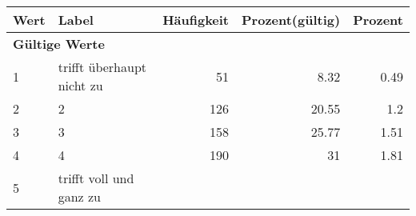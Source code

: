      \begin{longtable}{lXrrr}
     \toprule
     \textbf{Wert} & \textbf{Label} & \textbf{Häufigkeit} & \textbf{Prozent(gültig)} & \textbf{Prozent} \\
     \endhead
     \midrule
     \multicolumn{5}{l}{\textbf{Gültige Werte}}\\

     1 &
     \multicolumn{1}{X}{ trifft überhaupt nicht zu   } &


       \num{51} &
       \num[round-mode=places,round-precision=2]{8,32} &
         \num[round-mode=places,round-precision=2]{0,49} \\

     2 &
     \multicolumn{1}{X}{ 2   } &


       \num{126} &
       \num[round-mode=places,round-precision=2]{20,55} &
         \num[round-mode=places,round-precision=2]{1,2} \\

     3 &
     \multicolumn{1}{X}{ 3   } &


       \num{158} &
       \num[round-mode=places,round-precision=2]{25,77} &
         \num[round-mode=places,round-precision=2]{1,51} \\

     4 &
     \multicolumn{1}{X}{ 4   } &


       \num{190} &
       \num[round-mode=places,round-precision=2]{31} &
         \num[round-mode=places,round-precision=2]{1,81} \\

     5 &
     \multicolumn{1}{X}{ trifft voll und ganz zu   } &



\end{longtable}
